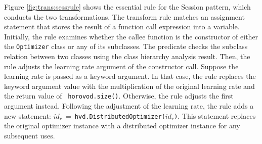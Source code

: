 Figure \ref{fig:trans:sessrule} shows the essential rule for the Session pattern,
which conducts the two transformations.
The transform rule matches an assignment statement that stores the result of a
function call expression into a variable.
Initially, the rule examines whether the callee function is the constructor of
either the {\tt Optimizer} class or any of its subclasses.
The predicate \ktsubtysubs{\smodenv} checks the subclass relation between two
classes using the class hierarchy analysis result.
Then, the rule adjusts the learning rate argument of the constructor call. 
Suppose the learning rate is passed as a keyword argument. 
In that case, the rule replaces the keyword argument value with the
multiplication of the original learning rate and the return value of {\tt
horovod.size()}.
Otherwise, the rule adjusts the first argument instead.
Following the adjustment of the learning rate, the rule adds a new statement:
$id_r\ =\ ${\tt hvd.DistributedOptimizer($id_r$)}. 
This statement replaces the original optimizer instance with a distributed
optimizer instance for any subsequent uses.



